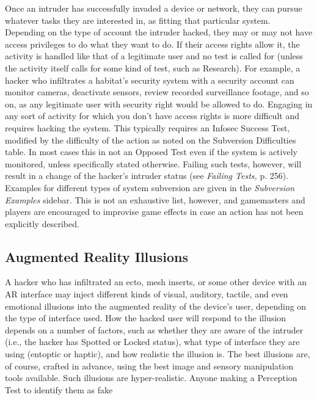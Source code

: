 Once an intruder has successfully invaded a device 
or network, they can pursue whatever tasks they are 
interested in, as fitting that particular system. Depending
on the type of account the intruder hacked, they
may or may not have access privileges to do what 
they want to do. If their access rights allow it, the 
activity is handled like that of a legitimate user and 
no test is called for (unless the activity itself calls for 
some kind of test, such as Research). For example, a 
hacker who infiltrates a habitat's security system with 
a security account can monitor cameras, deactivate 
sensors, review recorded surveillance footage, and so 
on, as any legitimate user with security right would be 
allowed to do.
Engaging in any sort of activity for which you 
don't have access rights is more difficult and requires 
hacking the system. This typically requires an Infosec 
Success Test, modified by the difficulty of the action 
as noted on the Subversion Difficulties table. In most 
cases this in not an Opposed Test even if the system is 
actively monitored, unless specifically stated otherwise. 
Failing such tests, however, will result in a change of 
the hacker's intruder status (see \textit{Failing Tests,} p. 256).
Examples for different types of system subversion 
are given in the \textit{Subversion Examples} sidebar. This 
is not an exhaustive list, however, and gamemasters 
and players are encouraged to improvise game effects 
in case an action has not been explicitly described.

\subsection{Augmented Reality Illusions}

A hacker who has infiltrated an ecto, mesh inserts, or 
some other device with an AR interface may inject 
different kinds of visual, auditory, tactile, and even 
emotional illusions into the augmented reality of 
the device's user, depending on the type of interface 
used. How the hacked user will respond to the illusion
depends on a number of factors, such as whether
they are aware of the intruder (i.e., the hacker has 
Spotted or Locked status), what type of interface they 
are using (entoptic or haptic), and how realistic the 
illusion is.
The best illusions are, of course, crafted in advance, 
using the best image and sensory manipulation tools 
available. Such illusions are hyper-realistic. Anyone 
making a Perception Test to identify them as fake 

